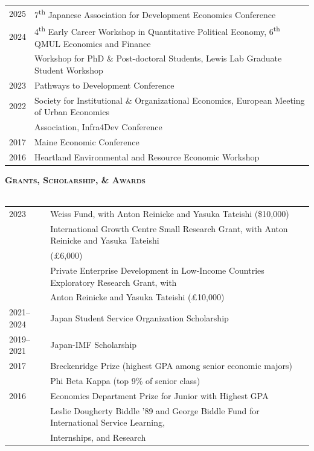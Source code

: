 \documentclass[11pt]{article}
\newcommand{\lineunder}{\vspace*{-8pt} \\ \hspace*{-18pt} \hrulefill \\}
\newcommand{\header}[1]{{\hspace*{-15pt}\vspace*{6pt} \textsc{#1}} \vspace*{-6pt} \lineunder}
\begin{document}
\begin{tabular}{l @{\hspace{10ex}} l }
	2025 & 7\textsuperscript{th} Japanese Association for Development Economics Conference \\ 
	2024 & 4\textsuperscript{th} Early Career Workshop in Quantitative Political Economy, 6\textsuperscript{th} QMUL Economics and Finance \\
	& Workshop for PhD \& Post-doctoral Students, Lewis Lab Graduate Student Workshop \\
	2023 & Pathways to Development Conference \\
	2022 & Society for Institutional \& Organizational Economics, European Meeting of Urban Economics \\
	& Association, Infra4Dev Conference \\
	2017 & Maine Economic Conference \\
	2016 & Heartland Environmental and Resource Economic Workshop  \\
\end{tabular}
\vspace{1mm}
\hfill{}




\clearpage
\header{\textbf{Grants, Scholarship, \& Awards}}

\begin{tabular}{l @{\hspace{4.5ex}} l }
2023 & Weiss Fund, with Anton Reinicke and Yasuka Tateishi (\$10,000) \\
& International Growth Centre Small Research Grant, with Anton Reinicke and Yasuka Tateishi \\
& (£6,000) \\
& Private Enterprise Development in Low-Income Countries Exploratory Research Grant, with \\
 & Anton Reinicke and Yasuka Tateishi (£10,000) \\
2021--2024 & Japan Student Service Organization Scholarship \\
2019--2021 & Japan-IMF Scholarship \\
2017 & Breckenridge Prize (highest GPA among senior economic majors) \\
& Phi Beta Kappa (top 9\% of senior class) \\
2016 & Economics Department Prize for Junior with Highest GPA \\
& Leslie Dougherty Biddle '89 and George Biddle Fund for International Service Learning, \\
& Internships, and Research \\
\end{tabular}
\vspace{1mm}
\hfill{}
\end{document}
